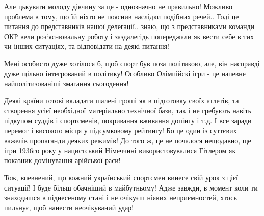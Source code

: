 Але цькувати молоду дівчину за це - однозначно не правильно! Можливо проблема в
тому, що їй ніхто не пояснив наслідки подібних речей.. Тоді це питання до
представників нашої делегації.. знаю, що з представниками команди ОКР вели
роз‘яснювальну роботу і заздалегідь попереджали як вести себе в тих чи інших
ситуаціях, та відповідати на деякі питання! 

Мені особисто дуже хотілося б, щоб спорт був поза політикою, але, він насправді
дуже щільно інтегрований в політику! Особливо Олімпійскі ігри - це напевне
найполітизованіші змагання сьогодення! 

Деякі країни готові вкладати шалені гроші як в підготовку своїх атлетів, та
створення усієї необхідної матеріально технічної бази, так і не гребують навіть
підкупом суддів і спортсменів, покривання вживання допінгу і т.д. І все заради
перемог і високого місця у підсумковому рейтингу! Бо це один із суттєвих
важелів пропаганди деяких режимів! До того ж, це не почалося нещодавно, ще ігри
1936го року у нацистський Німеччині використовувалися Гітлером як показник
домінування арійської раси!

Тож, впевнений, що кожний український спортсмен винесе свій урок з цієї
ситуації! І буде більш обачніший в майбутньому! Адже завжди, в момент коли ти
знаходишся в піднесеному стані і не очікуєш ніяких неприємностей, хтось
пильнує, щоб нанести неочікуваний удар!✊🏾
